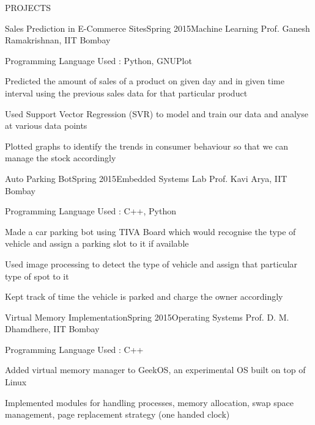 \documentclass{resume} %
\begin{document}

\begin{rSection}{PROJECTS}


\begin{rSubsection}{Sales Prediction in E-Commerce Sites}{Spring 2015}{Machine Learning }{Prof. Ganesh Ramakrishnan, IIT Bombay}
\item Programming Language Used : Python, GNUPlot
\item Predicted the amount of sales of a product on given day and in given time interval using the previous sales data
for that particular product
\item Used Support Vector Regression (SVR) to model and train our data and analyse at various data points
\item Plotted graphs to identify the trends in consumer behaviour so that we can manage the stock accordingly
\end{rSubsection}


\begin{rSubsection}{Auto Parking Bot}{Spring 2015}{Embedded Systems Lab }{ Prof. Kavi Arya, IIT Bombay}
\item Programming Language Used : C++, Python
\item Made a car parking bot using TIVA Board which would recognise the type of vehicle and assign a parking slot to it if available
\item Used image processing to detect the type of vehicle and assign that particular type of spot to it
\item Kept track of time the vehicle is parked and charge the owner accordingly
\end{rSubsection}


\begin{rSubsection}{Virtual Memory Implementation}{Spring 2015}{Operating Systems }{Prof. D. M. Dhamdhere, IIT Bombay}
\item Programming Language Used : C++
\item Added virtual memory manager to GeekOS, an experimental OS built on top of Linux
\item Implemented modules for handling processes, memory allocation, swap space management, page replacement strategy (one handed clock)
\end{rSubsection}


\end{rSection}
\end{document}
